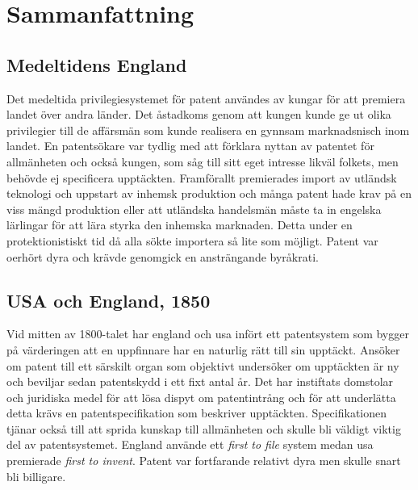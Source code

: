 \section{Sammanfattning}
\label{sec:samm}


\subsection{Medeltidens England}

Det medeltida privilegiesystemet för patent användes av kungar för att premiera landet över andra länder. Det åstadkoms genom att kungen kunde ge ut olika privilegier till de affärsmän som kunde realisera en gynnsam marknadsnisch inom landet. En patentsökare var tydlig med att förklara nyttan av patentet för allmänheten och också kungen, som såg till sitt eget intresse likväl folkets, men behövde ej specificera upptäckten. Framförallt premierades import av utländsk teknologi och uppstart av inhemsk produktion och många patent hade krav på en viss mängd produktion eller att utländska handelsmän måste ta in engelska lärlingar för att lära styrka den inhemska marknaden. Detta under en protektionistiskt tid då alla sökte importera så lite som möjligt. Patent var oerhört dyra och krävde genomgick en ansträngande byråkrati.

\subsection{USA och England, 1850}

Vid mitten av 1800-talet har england och usa infört ett patentsystem som bygger på värderingen att en uppfinnare har en naturlig rätt till sin upptäckt. Ansöker om patent till ett särskilt organ som objektivt undersöker om upptäckten är ny och beviljar sedan patentskydd i ett fixt antal år. Det har instiftats domstolar och juridiska medel för att lösa dispyt om patentintrång och för att underlätta detta krävs en patentspecifikation som beskriver upptäckten. Specifikationen tjänar också till att sprida kunskap till allmänheten och skulle bli väldigt viktig del av patentsystemet. England använde ett \emph{first to file} system medan usa premierade \emph{first to invent}. Patent var fortfarande relativt dyra men skulle snart bli billigare.

